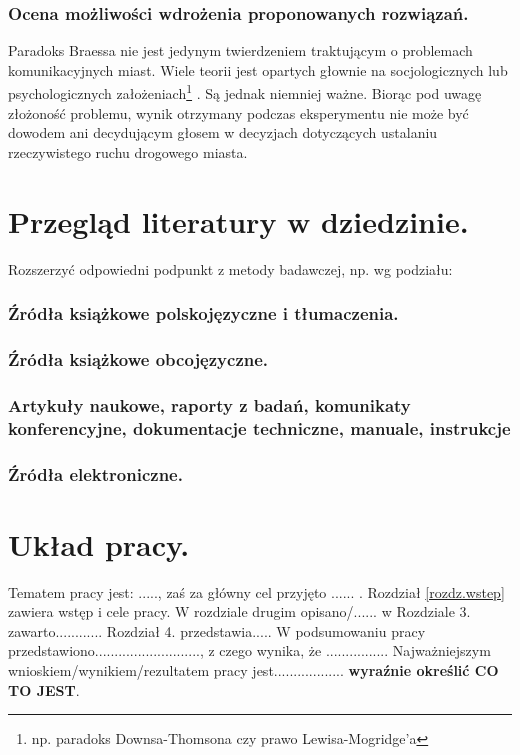 \documentclass[twoside,12pt]{report}
\begin{document}
\subsubsection{Ocena możliwości wdrożenia proponowanych rozwiązań.}
Paradoks Braessa nie jest jedynym twierdzeniem traktującym o problemach komunikacyjnych miast. Wiele teorii jest opartych głownie na socjologicznych lub psychologicznych założeniach\footnote{np. paradoks Downsa-Thomsona\cite{downs} czy prawo Lewisa-Mogridge’a\cite{lewis}}
. Są jednak niemniej ważne.
Biorąc pod uwagę złożoność problemu, wynik otrzymany podczas eksperymentu nie może być dowodem ani decydującym głosem w decyzjach dotyczących ustalaniu rzeczywistego ruchu drogowego miasta. 


\section{Przegląd literatury w dziedzinie.}
Rozszerzyć odpowiedni podpunkt z metody badawczej, np. wg podziału:
\subsubsection{Źródła książkowe polskojęzyczne i tłumaczenia.}
\subsubsection{Źródła książkowe obcojęzyczne.}
\subsubsection{Artykuły naukowe, raporty z badań, komunikaty konferencyjne,
dokumentacje techniczne, manuale, instrukcje}
\subsubsection{Źródła elektroniczne.}


\section{Układ pracy.}
Tematem pracy jest: ....., zaś za główny cel przyjęto ...... . 
Rozdział \ref{rozdz.wstep} zawiera wstęp i cele pracy. W rozdziale drugim
opisano/...... w Rozdziale 3. zawarto............ Rozdział 4. przedstawia..... 
W podsumowaniu pracy przedstawiono..........................., z czego wynika,
że ................  
Najważniejszym wnioskiem/wynikiem/rezultatem pracy jest.................. {\bf wyraźnie określić
CO TO JEST}. 
\end{document}
